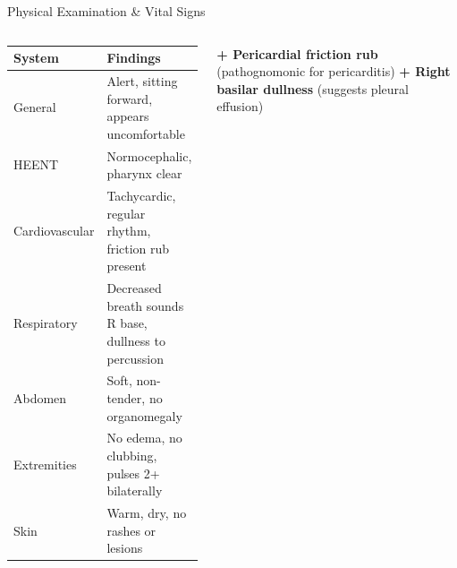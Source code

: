 \documentclass[10pt,aspectratio=169]{beamer}
\begin{document}
\begin{frame}{Physical Examination \& Vital Signs}
\begin{columns}[T]
    \begin{tcolorbox}[infobox,title={\faFile\hspace{4pt}Physical Examination}]
      \small
      \renewcommand{\arraystretch}{1.3}
      \begin{tabular}{@{}>{\raggedright\arraybackslash}p{}>{\raggedright\arraybackslash}p{}@{}}
        \toprule
        \textbf{System} & \textbf{Findings} \\
        \midrule
        General & Alert, sitting forward, appears uncomfortable \\
        HEENT & Normocephalic, pharynx clear \\
        Cardiovascular & Tachycardic, regular rhythm, friction rub present \\
        Respiratory & Decreased breath sounds R base, dullness to percussion \\
        Abdomen & Soft, non-tender, no organomegaly \\
        Extremities & No edema, no clubbing, pulses 2+ bilaterally \\
        Skin & Warm, dry, no rashes or lesions \\
        \bottomrule
      \end{tabular}
    \end{tcolorbox}

    \vspace{0.2cm}

    \begin{tcolorbox}[alertbox,title={\faSearch\hspace{4pt}Pertinent Positives}]
      \small
      \textbf{+ Pericardial friction rub} (pathognomonic for pericarditis)
      \hspace{1cm}
      \textbf{+ Right basilar dullness} (suggests pleural effusion)
    \end{tcolorbox}
  \end{columns}
\end{frame}
\end{document}
